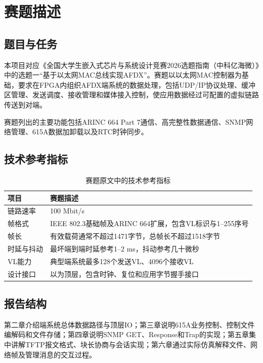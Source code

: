 \chapter{赛题描述}
\section{题目与任务}
本项目对应《全国大学生嵌入式芯片与系统设计竞赛2026选题指南（中科亿海微）》中的选题一“基于以太网MAC总线实现AFDX”。赛题以以太网MAC控制器为基础，要求在FPGA内组织AFDX端系统的数据处理，包括UDP/IP协议处理、缓冲区管理、发送调度、接收管理和媒体接入控制，使应用数据经过可配置的虚拟链路传送到对端。

赛题列出的主要功能包括ARINC 664 Part 7通信、高完整性数据通信、SNMP网络管理、615A数据加卸载以及RTC时钟同步。

\section{技术参考指标}
\begin{table}[htbp]\centering\small
\caption{赛题原文中的技术参考指标}
\begin{tabularx}{\linewidth}{@{}l Y@{}}\toprule 项目 & 赛题描述\\\midrule
链路速率 & 100 Mbit/s\\
帧格式 & IEEE 802.3基础帧及ARINC 664扩展，包含VL标识与1--255序号\\
帧长 & 有效载荷通常不超过1471字节，总帧长不超过1518字节\\
时延与抖动 & 最坏端到端时延参考1--2 ms，抖动参考几十微秒\\
VL能力 & 典型端系统最多128个发送VL、4096个接收VL\\
设计接口 & 以为顶层，包含时钟、复位和应用字节握手接口\\\bottomrule
\end{tabularx}\end{table}

\section{报告结构}
第二章介绍端系统总体数据路径与顶层IO；第三章说明615A业务控制、控制文件编解码和文件存储；第四章说明SNMP GET、Response和Trap的实现；第五章集中讲解TFTP报文格式、块长协商与会话实现；第六章通过实际仿真解释文件、网络帧及管理消息的交互过程。

